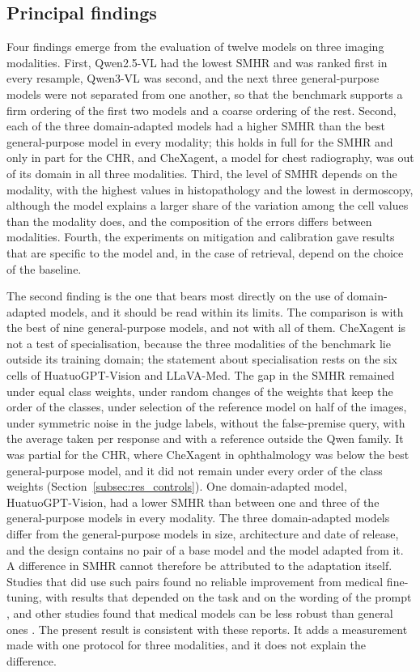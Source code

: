 \documentclass[11pt,a4paper]{article}
\newcommand{\SMHR}{\ensuremath{\mathrm{SMHR}}}
\newcommand{\CHR}{\ensuremath{\mathrm{CHR}}}
\begin{document}
\subsection{Principal findings}\label{sec:disc_findings}
Four findings emerge from the evaluation of twelve models on three imaging modalities. First, Qwen2.5-VL had the lowest \SMHR{} and was ranked first in every resample, Qwen3-VL was second, and the next three general-purpose models were not separated from one another, so that the benchmark supports a firm ordering of the first two models and a coarse ordering of the rest. Second, each of the three domain-adapted models had a higher \SMHR{} than the best general-purpose model in every modality; this holds in full for the \SMHR{} and only in part for the \CHR{}, and CheXagent, a model for chest radiography, was out of its domain in all three modalities. Third, the level of \SMHR{} depends on the modality, with the highest values in histopathology and the lowest in dermoscopy, although the model explains a larger share of the variation among the cell values than the modality does, and the composition of the errors differs between modalities. Fourth, the experiments on mitigation and calibration gave results that are specific to the model and, in the case of retrieval, depend on the choice of the baseline.

The second finding is the one that bears most directly on the use of domain-adapted models, and it should be read within its limits. The comparison is with the best of nine general-purpose models, and not with all of them. CheXagent is not a test of specialisation, because the three modalities of the benchmark lie outside its training domain; the statement about specialisation rests on the six cells of HuatuoGPT-Vision and LLaVA-Med. The gap in the \SMHR{} remained under equal class weights, under random changes of the weights that keep the order of the classes, under selection of the reference model on half of the images, under symmetric noise in the judge labels, without the false-premise query, with the average taken per response and with a reference outside the Qwen family. It was partial for the \CHR{}, where CheXagent in ophthalmology was below the best general-purpose model, and it did not remain under every order of the class weights (Section~\ref{subsec:res_controls}). One domain-adapted model, HuatuoGPT-Vision, had a lower \SMHR{} than between one and three of the general-purpose models in every modality. The three domain-adapted models differ from the general-purpose models in size, architecture and date of release, and the design contains no pair of a base model and the model adapted from it. A difference in \SMHR{} cannot therefore be attributed to the adaptation itself. Studies that did use such pairs found no reliable improvement from medical fine-tuning, with results that depended on the task and on the wording of the prompt \citep{mclaughlin2026knowledge,sabbaghziarani2026confident}, and other studies found that medical models can be less robust than general ones \citep{wu2024halluvqa,gu2024medvh,xu2025sycophancy}. The present result is consistent with these reports. It adds a measurement made with one protocol for three modalities, and it does not explain the difference.
\end{document}

